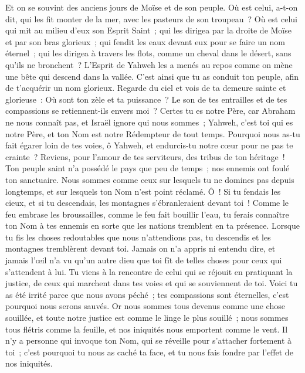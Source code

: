 \begin{multicols}{2}
Et on se souvint des anciens jours de Moïse et de son peuple. Où est celui, a-t-on dit, qui les fit monter de la mer, avec les pasteurs de son troupeau~? Où est celui qui mit au milieu d'eux son Esprit Saint~;
qui les dirigea par la droite de Moïse et par son bras glorieux~; qui fendit les eaux devant eux pour se faire un nom éternel~;
qui les dirigea à travers les flots, comme un cheval dans le désert, sans qu'ils ne bronchent~?
L'Esprit de Yahweh les a menés au repos comme on mène une bête qui descend dans la vallée. C'est ainsi que tu as conduit ton peuple, afin de t'acquérir un nom glorieux.
Regarde du ciel et vois de ta demeure sainte et glorieuse~: Où sont ton zèle et ta puissance~? Le son de tes entrailles et de tes compassions se retiennent-ils envers moi~?
Certes tu es notre Père, car Abraham ne nous connaît pas, et Israël ignore qui nous sommes~; Yahweh, c'est toi qui es notre Père, et ton Nom est notre Rédempteur de tout temps.
Pourquoi nous as-tu fait égarer loin de tes voies, ô Yahweh, et endurcis-tu notre cœur pour ne pas te crainte~? Reviens, pour l'amour de tes serviteurs, des tribus de ton héritage~!
Ton peuple saint n'a possédé le pays que peu de temps~; nos ennemis ont foulé ton sanctuaire.
Nous sommes comme ceux sur lesquels tu ne domines pas depuis longtemps, et sur lesquels ton Nom n'est point réclamé. Ô~! Si tu fendais les cieux, et si tu descendais, les montagnes s'ébranleraient devant toi~!
\VerseOne{}Comme le feu embrase les broussailles, comme le feu fait bouillir l'eau, tu ferais connaître ton Nom à tes ennemis en sorte que les nations tremblent en ta présence.
Lorsque tu fis les choses redoutables que nous n'attendions pas, tu descendis et les montagnes tremblèrent devant toi.
Jamais on n'a appris ni entendu dire, et jamais l'œil n'a vu qu'un autre dieu que toi fît de telles choses pour ceux qui s'attendent à lui.
Tu viens à la rencontre de celui qui se réjouit en pratiquant la justice, de ceux qui marchent dans tes voies et qui se souviennent de toi. Voici tu as été irrité parce que nous avons péché~; tes compassions sont éternelles, c'est pourquoi nous serons sauvés.
Or nous sommes tous devenus comme une chose souillée, et toute notre justice est comme le linge le plus souillé~; nous sommes tous flétris comme la feuille, et nos iniquités nous emportent comme le vent.
Il n'y a personne qui invoque ton Nom, qui se réveille pour s'attacher fortement à toi~; c'est pourquoi tu nous as caché ta face, et tu nous fais fondre par l'effet de nos iniquités.

\end{multicols}

